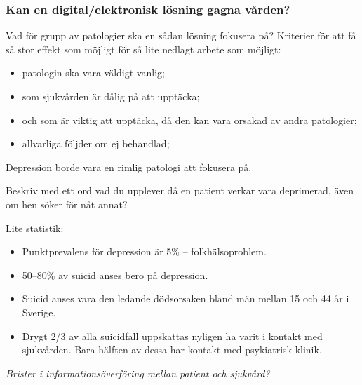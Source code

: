 \documentclass[english]{beamer}
\begin{document}
\begin{frame}
\frametitle{Kan en digital/elektronisk lösning gagna vården?}
	Vad för grupp av patologier ska en sådan lösning fokusera på?
	Kriterier för att få så stor effekt som möjligt för så lite nedlagt arbete som möjligt:
	\begin{itemize}
	\item patologin ska vara väldigt vanlig;
	\item som sjukvården är dålig på att upptäcka;
	\item och som är viktig att upptäcka, då den kan vara orsakad av andra patologier;
	\item allvarliga följder om ej behandlad;
	\end{itemize}
	\pause
	Depression borde vara en rimlig patologi att fokusera på.
\end{frame}

\begin{frame}
\textcolor{lila}{Beskriv med ett ord vad du upplever då en patient verkar vara deprimerad, även om hen söker för nåt annat?}
\end{frame}

\begin{frame}
	Lite statistik:
	\begin{itemize}
	\item Punktprevalens för depression är 5\% -- folkhälsoproblem.
	\item 50--80\% av suicid anses bero på depression.
	\item Suicid anses vara den ledande dödsorsaken bland män mellan 15 och 44 år i Sverige.
	\item Drygt 2/3 av alla suicidfall uppskattas nyligen ha varit i kontakt med sjukvården. Bara hälften av dessa har kontakt med psykiatrisk klinik.
	\end{itemize}
	\pause
	{\textit{Brister i informationsöverföring mellan patient och sjukvård?}}

\end{frame}
\end{document}
